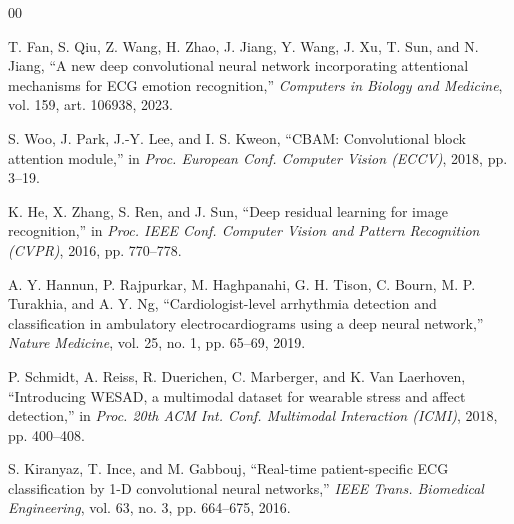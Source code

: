 \documentclass[conference]{IEEEtran}
\begin{document}
\begin{thebibliography}{00}

 T. Fan, S. Qiu, Z. Wang, H. Zhao, J. Jiang, Y. Wang, J. Xu,
T. Sun, and N. Jiang, ``A new deep convolutional neural network incorporating
attentional mechanisms for ECG emotion recognition,'' \textit{Computers in
Biology and Medicine}, vol. 159, art. 106938, 2023.

 S. Woo, J. Park, J.-Y. Lee, and I. S. Kweon, ``CBAM: Convolutional
block attention module,'' in \textit{Proc. European Conf. Computer Vision
(ECCV)}, 2018, pp. 3--19.

 K. He, X. Zhang, S. Ren, and J. Sun, ``Deep residual learning
for image recognition,'' in \textit{Proc. IEEE Conf. Computer Vision and Pattern
Recognition (CVPR)}, 2016, pp. 770--778.

 A. Y. Hannun, P. Rajpurkar, M. Haghpanahi, G. H. Tison,
C. Bourn, M. P. Turakhia, and A. Y. Ng, ``Cardiologist-level arrhythmia detection
and classification in ambulatory electrocardiograms using a deep neural
network,'' \textit{Nature Medicine}, vol. 25, no. 1, pp. 65--69, 2019.

 P. Schmidt, A. Reiss, R. Duerichen, C. Marberger, and K. Van
Laerhoven, ``Introducing WESAD, a multimodal dataset for wearable stress and
affect detection,'' in \textit{Proc. 20th ACM Int. Conf. Multimodal Interaction
(ICMI)}, 2018, pp. 400--408.

 S. Kiranyaz, T. Ince, and M. Gabbouj, ``Real-time
patient-specific ECG classification by 1-D convolutional neural networks,''
\textit{IEEE Trans. Biomedical Engineering}, vol. 63, no. 3, pp. 664--675, 2016.

\end{thebibliography}
\end{document}

